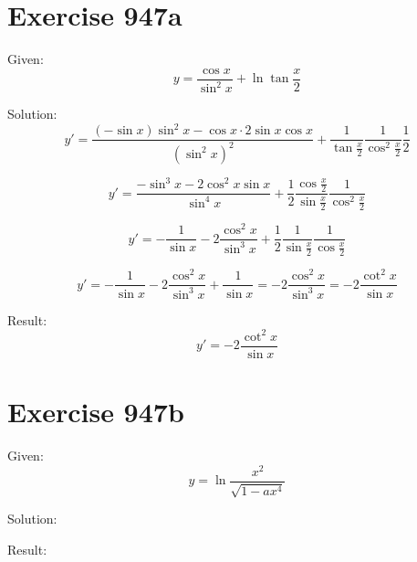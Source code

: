 \documentclass[a4paper, 10pt]{scrartcl}
\begin{document}
\section{Exercise 947a}

Given:
\[
y = \frac{\cos{x}}{\sin^{2}{x}} + \ln{\tan{\frac{x}{2}}}
\]

Solution:
\[
y' = \frac{(-\sin{x})\sin^{2}{x} - \cos{x}\cdot 2\sin{x}\cos{x}}{(\sin^{2}{x})^{2}} +
    \frac{1}{\tan{\frac{x}{2}}}\frac{1}{\cos^{2}{\frac{x}{2}}}\frac{1}{2}
\]

\[
y' = \frac{-\sin^{3}{x} - 2\cos^{2}{x}\sin{x}}{\sin^{4}{x}} +
    \frac{1}{2}\frac{\cos{\frac{x}{2}}}{\sin{\frac{x}{2}}}\frac{1}{\cos^{2}{\frac{x}{2}}}
\]

\[
y' = -\frac{1}{\sin{x}} - 2\frac{\cos^{2}{x}}{\sin^{3}{x}} +
    \frac{1}{2}\frac{1}{\sin{\frac{x}{2}}}\frac{1}{\cos{\frac{x}{2}}}
\]

\[
y' = -\frac{1}{\sin{x}} - 2\frac{\cos^{2}{x}}{\sin^{3}{x}} +
    \frac{1}{\sin{x}} = -2\frac{\cos^{2}{x}}{\sin^{3}{x}} = -2\frac{\cot^{2}{x}}{\sin{x}}
\]

Result:
\[
y' = -2\frac{\cot^{2}{x}}{\sin{x}}
\]

\section{Exercise 947b}

Given:
\[
y = \ln{\frac{x^{2}}{\sqrt{1 - ax^{4}}}}
\]

Solution:

Result:
\end{document}
